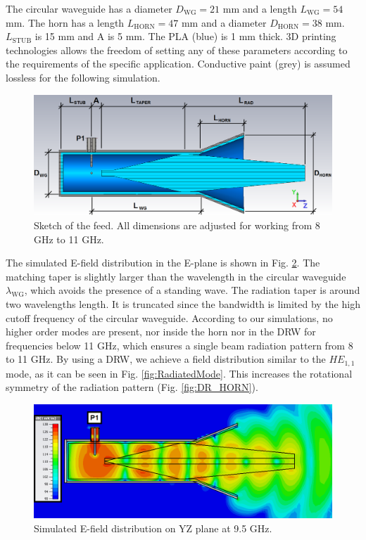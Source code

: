 \documentclass{IEEEtran}
\begin{document}
The circular waveguide has a diameter $D_\text{WG}=21$ mm and a length $L_\text{WG}=54$ mm. The horn has a length $L_\text{HORN}=47$ mm and a diameter $D_\text{HORN}=38$ mm. $L_\text{STUB}$ is 15 mm and A is 5 mm. The PLA (blue) is 1 mm thick. 3D printing technologies allows the freedom of setting any of these parameters according to the requirements of the specific application. Conductive paint (grey) is assumed lossless for the following simulation.

\begin{figure}[h]
	\centerline{\includegraphics[width=\columnwidth]{images/Sketch_Horn.png}}
	\caption{Sketch of the feed. All dimensions are adjusted for working from 8 GHz to 11 GHz.}
	\label{fig:Sketch_HORN}
\end{figure}

The simulated E-field distribution in the E-plane is shown in Fig. \ref{fig:E-field_HORN}. The matching taper is slightly larger than the wavelength in the circular waveguide $\lambda_\text{WG}$, which avoids the presence of a standing wave\cite{ref:DRWGeneralov,ref:DRWPaper}. The radiation taper is around two wavelengths length. It is truncated since the bandwidth is limited by the high cutoff frequency of the circular waveguide\cite{ref:DRWPaper}. According to our simulations, no higher order modes are present, nor inside the horn nor in the DRW for frequencies below 11 GHz, which ensures a single beam radiation pattern\cite{ref:DRWPaper} from 8 to 11 GHz. By using a DRW, we achieve a field distribution similar to the $HE_{1,1}$ mode, as it can be seen in Fig. \ref{fig:RadiatedMode}. This increases the rotational symmetry of the radiation pattern (Fig. \ref{fig:DR_HORN})\cite{ref:rotationalSymmetryHe11}.

\begin{figure}[h]
	\centerline{\includegraphics[width=\columnwidth]{images/EField_Horn.png}}
	\caption{Simulated E-field distribution on YZ plane at 9.5 GHz.}
	\label{fig:E-field_HORN}
\end{figure}
\end{document}
